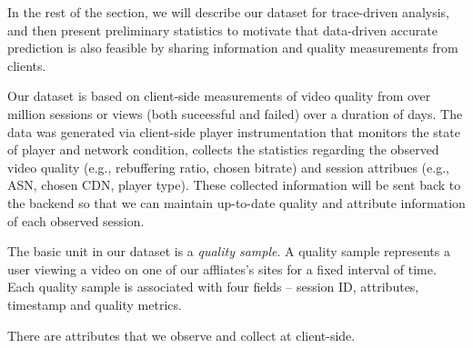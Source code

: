  In the rest of the section, we will describe our dataset for trace-driven analysis, and then present preliminary statistics to motivate that data-driven accurate prediction is also feasible by sharing information and quality measurements from clients. 

\label{subsec:dataset}

 Our dataset is based on client-side measurements of video quality from over \fillme million sessions or views (both suceessful and failed) over a duration of \fillme days. The data was generated via client-side player instrumentation that monitors the state of player and network condition, collects the statistics regarding the observed video quality (e.g., rebuffering ratio, chosen bitrate) and session attribues (e.g., ASN, chosen CDN, player type). These collected information will be sent back to the backend so that we can maintain up-to-date quality and attribute information of each observed session.

 The basic unit in our dataset is a {\it quality sample}. A quality sample represents a user viewing a video on one of our affliates's sites for a fixed interval of time. Each quality sample is associated with four fields -- session ID, attributes, timestamp and quality metrics. 

 There are \fillme attributes that we observe and collect at client-side. 

